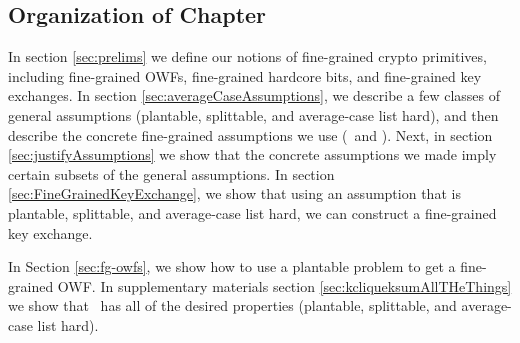 \subsection{Organization of Chapter}

In section \ref{sec:prelims} we define our notions of fine-grained crypto primitives, including fine-grained OWFs, fine-grained hardcore bits, and  fine-grained key exchanges. In section \ref{sec:averageCaseAssumptions}, we describe a few classes of general assumptions (plantable, splittable, and average-case list hard), and then describe the concrete fine-grained assumptions we use (\kSum~and \zkclique). Next, in section \ref{sec:justifyAssumptions} we show that the concrete assumptions we made imply certain subsets of the general assumptions. 
In section \ref{sec:FineGrainedKeyExchange}, we show that using an assumption that is plantable, splittable, and average-case list hard, we can construct a fine-grained key exchange.

In Section \ref{sec:fg-owfs}, we show how to use a plantable problem to get a fine-grained OWF.
In supplementary materials section \ref{sec:kcliqueksumAllTHeThings} we show that \zkclique~has all of the desired properties (plantable, splittable, and average-case list hard).
